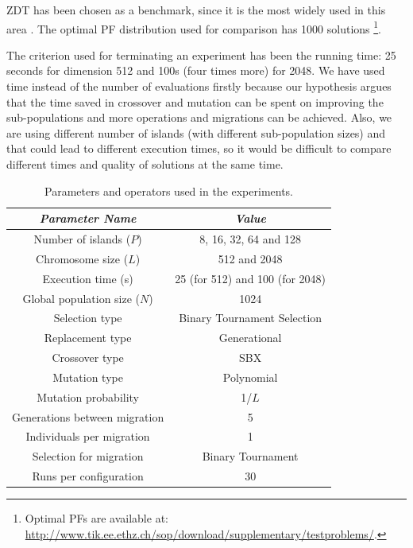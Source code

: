 \documentclass[preprint]{elsarticle}
\begin{document}
ZDT \citep{zdt2000a} has been chosen as a benchmark, since it is the most widely used in this area \citep{Deb03distributed,Martens13asynchronous,Wang09parallel,Durillo08masterslave}. The optimal PF distribution used for comparison has 1000 solutions \footnote{Optimal PFs are available at:   \url{http://www.tik.ee.ethz.ch/sop/download/supplementary/testproblems/}.}. 





The criterion used for terminating an experiment has been the running
time: 25 seconds for dimension 512 and 100s (four times more) for
2048. We have used time instead of the number of evaluations firstly
because our hypothesis argues that the time saved in crossover and
mutation can be spent on improving the sub-populations and more
operations and migrations can be achieved. Also, we are using
different number of islands (with different sub-population sizes) and that
could lead to different execution times, so it would be difficult to
compare different times and quality of solutions at the same time. 

\begin{table}
\begin{center}
\begin{tabular}{|c|c|}
\hline
{\em Parameter Name} & {\em Value} \\ \hline
Number of islands ($P$) & 8, 16, 32, 64 and 128 \\ \hline
Chromosome size ($L$) & 512 and 2048 \\ \hline
Execution time (s) & 25 (for 512) and 100 (for 2048) \\ \hline \hline
Global population size ($N$) & 1024 \\ \hline
Selection type & Binary Tournament Selection \\ \hline
Replacement type & Generational \\ \hline 
Crossover type & SBX \\ \hline
Mutation  type & Polynomial\\ \hline
Mutation probability & 1/$L$ \\ \hline
Generations between migration & 5 \\ \hline
Individuals per migration & 1 \\ \hline
Selection for migration & Binary Tournament\\ \hline
Runs per configuration & 30 \\ \hline
\end{tabular}
\caption{Parameters and operators used in the experiments.}
\label{tab:parameters}
\end{center}
\end{table}
\end{document}
